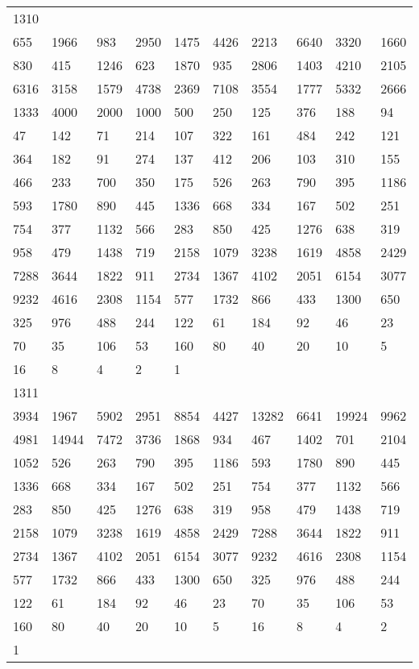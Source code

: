 \begin{longtable}{*{10}{l}}
1310&&&&&&&&&\\
655& 1966& 983& 2950& 1475& 4426& 2213& 6640& 3320& 1660\\
830& 415& 1246& 623& 1870& 935& 2806& 1403& 4210& 2105\\
6316& 3158& 1579& 4738& 2369& 7108& 3554& 1777& 5332& 2666\\
1333& 4000& 2000& 1000& 500& 250& 125& 376& 188& 94\\
47& 142& 71& 214& 107& 322& 161& 484& 242& 121\\
364& 182& 91& 274& 137& 412& 206& 103& 310& 155\\
466& 233& 700& 350& 175& 526& 263& 790& 395& 1186\\
593& 1780& 890& 445& 1336& 668& 334& 167& 502& 251\\
754& 377& 1132& 566& 283& 850& 425& 1276& 638& 319\\
958& 479& 1438& 719& 2158& 1079& 3238& 1619& 4858& 2429\\
7288& 3644& 1822& 911& 2734& 1367& 4102& 2051& 6154& 3077\\
9232& 4616& 2308& 1154& 577& 1732& 866& 433& 1300& 650\\
325& 976& 488& 244& 122& 61& 184& 92& 46& 23\\
70& 35& 106& 53& 160& 80& 40& 20& 10& 5\\
16& 8& 4& 2& 1& \\

1311&&&&&&&&&\\
3934& 1967& 5902& 2951& 8854& 4427& 13282& 6641& 19924& 9962\\
4981& 14944& 7472& 3736& 1868& 934& 467& 1402& 701& 2104\\
1052& 526& 263& 790& 395& 1186& 593& 1780& 890& 445\\
1336& 668& 334& 167& 502& 251& 754& 377& 1132& 566\\
283& 850& 425& 1276& 638& 319& 958& 479& 1438& 719\\
2158& 1079& 3238& 1619& 4858& 2429& 7288& 3644& 1822& 911\\
2734& 1367& 4102& 2051& 6154& 3077& 9232& 4616& 2308& 1154\\
577& 1732& 866& 433& 1300& 650& 325& 976& 488& 244\\
122& 61& 184& 92& 46& 23& 70& 35& 106& 53\\
160& 80& 40& 20& 10& 5& 16& 8& 4& 2\\
1& \\


\end{longtable}
